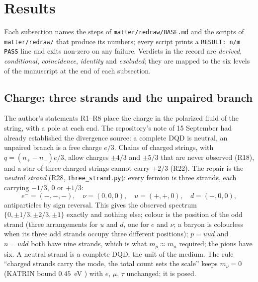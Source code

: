 \documentclass[11pt,a4paper]{article}
\theoremstyle{plain}
\theoremstyle{remark}
\begin{document}
\section{Results}\label{sec:results}

Each subsection names the steps of \texttt{matter/redraw/BASE.md} and the scripts of
\texttt{matter/redraw/} that produce its numbers; every script prints a \texttt{RESULT: n/m PASS}
line and exits non-zero on any failure. Verdicts in the record are \emph{derived},
\emph{conditional}, \emph{coincidence}, \emph{identity} and \emph{excluded}; they are mapped to
the six levels of the manuscript at the end of each subsection.

\subsection{Charge: three strands and the unpaired branch}\label{sec:charge}

The author's statements R1--R8 place the charge in the polarized fluid of the string, with a pole
at each end. The repository's note of 15 September had already established the divergence source:
a complete DQD is neutral, an unpaired branch is a free charge $e/3$. Chains of charged strings,
with $q = (n_+ - n_-)e/3$, allow charges $\pm 4/3$ and $\pm 5/3$ that are never observed (R18), and
a star of three charged strings cannot carry $+2/3$ (R22). The repair is the \emph{neutral
strand} (R28, \texttt{three\_strand.py}): every fermion is three strands, each carrying $-1/3$,
$0$ or $+1/3$:
\[
e^- = (-,-,-),\quad \nu = (0,0,0),\quad u = (+,+,0),\quad d = (-,0,0),
\]
antiparticles by sign reversal. This gives the observed spectrum $\{0, \pm1/3, \pm2/3, \pm1\}$
exactly and nothing else; colour is the position of the odd strand (three arrangements for $u$ and
$d$, one for $e$ and $\nu$; a baryon is colourless when its three odd strands occupy three
different positions); $p = uud$ and $n = udd$ both have nine strands, which is what
$m_p \approx m_n$ required; the pions have six. A neutral strand is a complete DQD, the unit of the
medium. The rule ``charged strands carry the mode, the total count sets the scale'' keeps
$m_\nu = 0$ (KATRIN bound $0.45$~eV \cite{katrin}) with $e$, $\mu$, $\tau$ unchanged; it is posed.
\end{document}

